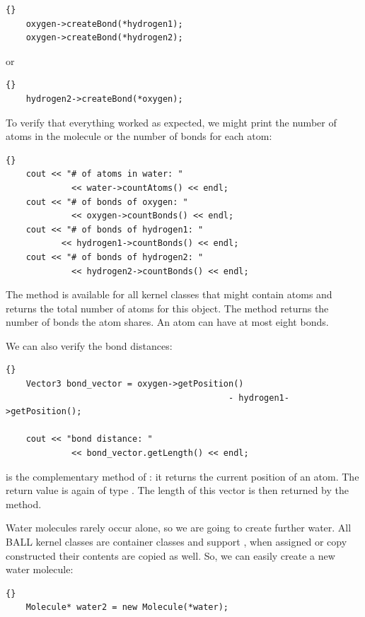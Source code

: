 \begin{lstlisting}{}
	oxygen->createBond(*hydrogen1);
	oxygen->createBond(*hydrogen2);
\end{lstlisting}

or

\begin{lstlisting}{}
	hydrogen2->createBond(*oxygen);
\end{lstlisting}

\noindent
To verify that everything worked as expected, we might print the number of
atoms in the molecule or the number of bonds for each atom:
	
\begin{lstlisting}{}
	cout << "# of atoms in water: " 
 			 << water->countAtoms() << endl;
	cout << "# of bonds of oxygen: " 
			 << oxygen->countBonds() << endl;
	cout << "# of bonds of hydrogen1: " 
		   << hydrogen1->countBonds() << endl;
	cout << "# of bonds of hydrogen2: " 
			 << hydrogen2->countBonds() << endl;
\end{lstlisting}

\noindent
The method  is available for all kernel classes that might
contain atoms and returns the total number of atoms for this object. The
method  returns the number of bonds the atom shares. An
atom can have at most eight bonds.

We can also verify the bond distances:
\begin{lstlisting}{}
	Vector3 bond_vector = oxygen->getPosition() 
										    - hydrogen1->getPosition();

	cout << "bond distance: " 
			 << bond_vector.getLength() << endl;
\end{lstlisting}
	
\noindent
{} is the complementary method of : it
returns the current position of an atom. The return value is again of type
. The length of this vector is then returned by the
 method. 

Water molecules rarely occur alone, so we are going to create further water.
All BALL kernel classes are container classes and support , \ie when assigned or copy constructed their contents are copied as
well. So, we can easily create a new water molecule:

\begin{lstlisting}{}
	Molecule* water2 = new Molecule(*water);
\end{lstlisting}
	
